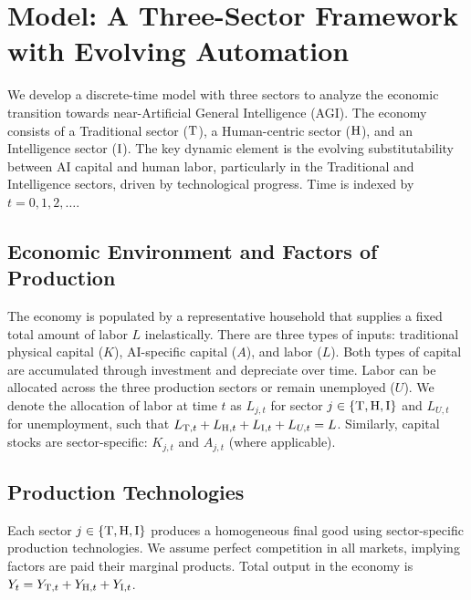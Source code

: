 \documentclass{article}
\newcommand{\sector}[1]{\textnormal{#1}}
\begin{document}
\section{Model: A Three-Sector Framework with Evolving Automation}
\label{sec:model}
We develop a discrete-time model with three sectors to analyze the economic transition towards near-Artificial General Intelligence (AGI). 
The economy consists of a Traditional sector ($\sector{T}$), a Human-centric sector ($\sector{H}$), and an Intelligence sector ($\sector{I}$). 
The key dynamic element is the evolving substitutability between AI capital and human labor, particularly in the Traditional and Intelligence sectors, driven by technological progress. 
Time is indexed by $t=0, 1, 2, \dots$.

\subsection{Economic Environment and Factors of Production}
The economy is populated by a representative household that supplies a fixed total amount of labor $L$ inelastically. 
There are three types of inputs: traditional physical capital ($K$), AI-specific capital ($A$), and labor ($L$). 
Both types of capital are accumulated through investment and depreciate over time. 
Labor can be allocated across the three production sectors or remain unemployed ($U$). 
We denote the allocation of labor at time $t$ as $L_{j,t}$ for sector $j \in \{\sector{T}, \sector{H}, \sector{I}\}$ and $L_{U,t}$ for unemployment, such that $L_{\sector{T},t} + L_{\sector{H},t} + L_{\sector{I},t} + L_{U,t} = L$. 
Similarly, capital stocks are sector-specific: $K_{j,t}$ and $A_{j,t}$ (where applicable).

\subsection{Production Technologies}
Each sector $j \in \{\sector{T}, \sector{H}, \sector{I}\}$ produces a homogeneous final good using sector-specific production technologies. 
We assume perfect competition in all markets, implying factors are paid their marginal products.
Total output in the economy is $Y_t = Y_{\sector{T},t} + Y_{\sector{H},t} + Y_{\sector{I},t}$.
\end{document}
